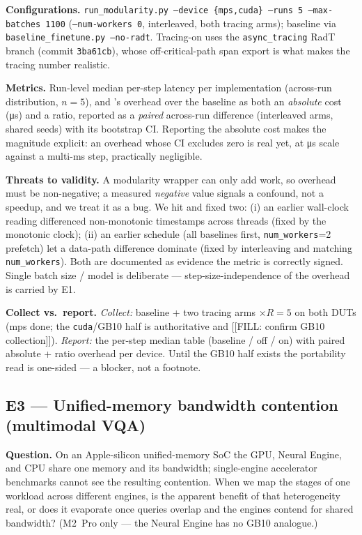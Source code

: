 \textbf{Configurations.}
\texttt{run\_modularity.py --device \{mps,cuda\} --runs 5 --max-batches 1100}
(\texttt{--num-workers 0}, interleaved, both tracing arms); baseline via
\texttt{baseline\_finetune.py --no-radt}. Tracing-on uses the
\texttt{async\_tracing} RadT branch (commit \texttt{3ba61cb}), whose
off-critical-path span export is what makes the tracing number realistic.

\textbf{Metrics.} Run-level median per-step latency per implementation
(across-run distribution, $n{=}5$), and \sysname{}'s overhead over the
baseline as both an \emph{absolute} cost (\si{\micro\second}) and a ratio,
reported as a \emph{paired} across-run difference (interleaved arms, shared
seeds) with its bootstrap CI. Reporting the absolute cost makes the
magnitude explicit: an overhead whose CI excludes zero is real yet, at
\si{\micro\second} scale against a multi-\si{\milli\second} step,
practically negligible.

\textbf{Threats to validity.} A modularity wrapper can only add work, so
overhead must be non-negative; a measured \emph{negative} value signals a
confound, not a speedup, and we treat it as a bug. We hit and fixed two:
(i) an earlier wall-clock reading differenced non-monotonic timestamps
across threads (fixed by the monotonic clock); (ii) an earlier schedule
(all baselines first, \texttt{num\_workers}=2 prefetch) let a data-path
difference dominate (fixed by interleaving and matching
\texttt{num\_workers}). Both are documented as evidence the metric is
correctly signed. Single batch size / model is deliberate ---
step-size-independence of the overhead is carried by E1.

\textbf{Collect vs.\ report.} \emph{Collect:} baseline + two tracing arms
$\times R{=}5$ on both DUTs (mps done; the \texttt{cuda}/GB10 half is
authoritative and [[FILL: confirm GB10 collection]]). \emph{Report:} the
per-step median table (baseline / off / on) with paired absolute + ratio
overhead per device. Until the GB10 half exists the portability read is
one-sided --- a blocker, not a footnote.

\subsection{E3 --- Unified-memory bandwidth contention (multimodal VQA)}
\label{sec:e3-vqa}

\textbf{Question.} On an Apple-silicon unified-memory SoC the GPU, Neural
Engine, and CPU share one memory and its bandwidth; single-engine
accelerator benchmarks cannot see the resulting contention. When we map
the stages of one workload across different engines, is the apparent
benefit of that heterogeneity real, or does it evaporate once queries
overlap and the engines contend for shared bandwidth? (M2~Pro only --- the
Neural Engine has no GB10 analogue.)

